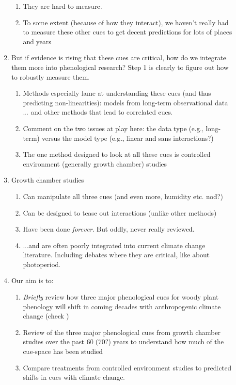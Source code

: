 \documentclass[11pt,letterpaper]{article}
\begin{document}
\begin{enumerate}
\begin{enumerate}
\begin{enumerate}
\item They are hard to measure.
\item To some extent (because of how they interact), we haven't really had to measure these other cues to get decent predictions for lots of places and years
\end{enumerate}
\item But if evidence is rising that these cues are critical, how do we integrate them more into phenological research? Step 1 is clearly to figure out how to robustly measure them. 
\begin{enumerate}
\item Methods especially lame at understanding these cues (and thus predicting non-linearities): models from long-term observational data ... and other methods that lead to correlated cues. 
\item Comment on the two issues at play here: the data type (e.g., long-term) versus the model type (e.g., linear and sans interactions?)
\item The one method designed to look at all these cues is controlled environment (generally growth chamber) studies \citep{nagano2012,satake2013} %
\end{enumerate}
\item Growth chamber studies
\begin{enumerate}
\item Can manipulate all three cues (and even more, humidity etc. nod?)
\item Can be designed to tease out interactions (unlike other methods)
\item Have been done \emph{forever}. But oddly, never really reviewed.
\item  ...and are often poorly integrated into current climate change literature. Including debates where they are critical, like about photoperiod. 
\end{enumerate}
\item Our aim is to:
\begin{enumerate}
\item \emph{Briefly} review how three major phenological cues for woody plant phenology will shift in coming decades with anthropogenic climate change (check \citet{primack2015})
\item Review of the three major phenological cues from growth chamber studies over the past 60 (70?) years to understand how much of the cue-space has been studied
\item Compare treatments from controlled environment studies to predicted shifts in cues with climate change.  

\end{enumerate}
\end{enumerate}
\end{enumerate}
\end{document}
